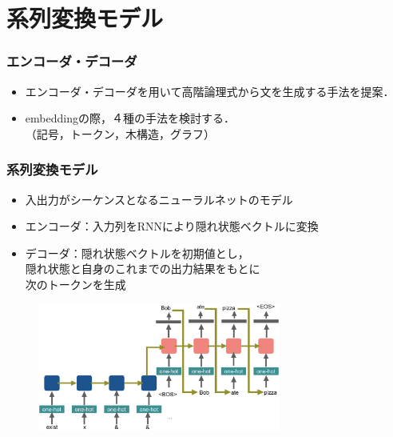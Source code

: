 \documentclass[dvipdfmx]{beamer}
\begin{document}
\section{系列変換モデル}
\begin{frame}
\frametitle{エンコーダ・デコーダ}
\begin{center}
\end{center}

\begin{itemize}
  \item {\color{berry}エンコーダ・デコーダ}を用いて高階論理式から文を生成する手法を提案．
  \item embeddingの際，４種の手法を検討する．\\（記号，トークン，木構造，グラフ）　
\end{itemize}


\end{frame}



\begin{frame}
\frametitle{系列変換モデル\citep{seq2seq} }
\begin{itemize}
  \item 入出力がシーケンスとなるニューラルネットのモデル
  \item エンコーダ：入力列をRNNにより隠れ状態ベクトルに変換
  \item デコーダ：隠れ状態ベクトルを初期値とし，\\隠れ状態と自身のこれまでの出力結果をもとに\\次のトークンを生成
\end{itemize}

\begin{center}
\begin{figure}[h]
	\includegraphics[width=8cm]{learn_model.png}
        \label{fig:seq2seq}
\end{figure}
\end{center}

\end{frame}
\end{document}
